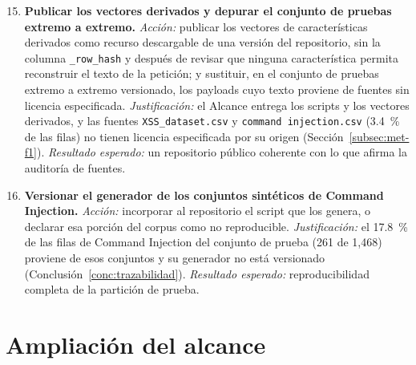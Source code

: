 \begin{enumerate}
    \setcounter{enumi}{14}
    \item \textbf{Publicar los vectores derivados y depurar el conjunto de pruebas extremo a
    extremo.} \textit{Acción:} publicar los vectores de características derivados como recurso
    descargable de una versión del repositorio, sin la columna \texttt{\_row\_hash} y después de
    revisar que ninguna característica permita reconstruir el texto de la petición; y sustituir, en
    el conjunto de pruebas extremo a extremo versionado, los payloads cuyo texto proviene de
    fuentes sin licencia especificada. \textit{Justificación:} el Alcance entrega los scripts y los
    vectores derivados, y las fuentes \texttt{XSS\_dataset.csv} y \texttt{command injection.csv}
    (3.4~\% de las filas) no tienen licencia especificada por su origen
    (Sección~\ref{subsec:met-f1}). \textit{Resultado esperado:} un repositorio público coherente
    con lo que afirma la auditoría de fuentes.

    \item \textbf{Versionar el generador de los conjuntos sintéticos de Command Injection.}
    \textit{Acción:} incorporar al repositorio el script que los genera, o declarar esa porción del
    corpus como no reproducible. \textit{Justificación:} el 17.8~\% de las filas de Command
    Injection del conjunto de prueba (261 de 1{,}468) proviene de esos conjuntos y su generador no
    está versionado (Conclusión~\ref{conc:trazabilidad}). \textit{Resultado esperado:}
    reproducibilidad completa de la partición de prueba.
\end{enumerate}

\section{Ampliación del alcance}

